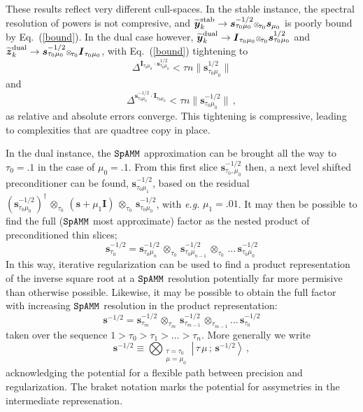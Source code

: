 \documentclass[letterpaper,twocolumn,amsmath,amsfont,amssymb,english,aps,jcp,preprintnumbers,groupaddress,nofootinbib,tightenlines,floatfix]{revtex4}
\newcommand{\mat}[1]{\boldsymbol{#1}}
\newcommand{\oto}{ {\scriptstyle \otimes}_{ \! \tau_0 } }
\newcommand{\otm}{ {\scriptstyle \otimes}_{ \! \tau_m } }
\newcommand{\otmm}{ {\scriptstyle \otimes}_{ \! \tau_{m-1}}}
\theoremstyle{plain}
\theoremstyle{remark}
\theoremstyle{plain}
\begin{document}
These results reflect very different cull-spaces.  In the stable instance, the spectral resolution of powers is not compresive, and  
$\widetilde{\mat{y}}^{\rm stab}_k \rightarrow  \mat{s}^{-1/2}_{\tau_0 \mu_0} \oto \mat{s}_{\mu_0}$ is  poorly bound by Eq.~(\ref{bound}).
In the dual case however, $\widetilde{\mat{y}}^{\rm dual}_k \rightarrow  \mat{I}_{\tau_0 \mu_0} \oto \mat{s}^{1/2}_{\tau_0 \mu_0}$
and $\widetilde{\mat{z}}^{\rm dual}_k \rightarrow  \mat{s}^{-1/2}_{\tau_0 \mu_0} \oto \mat{I}_{\tau_0 \mu_0}$, 
with Eq.~(\ref{bound}) tightening to
\begin{equation}\label{boundY}
\Delta^{\mat{I}_{\tau_0 \mu_0} \cdot \mat{s}^{1/2}_{\tau_0 \mu_0}} <  \tau n \lVert \mat{s}^{1/2}_{\tau_0 \mu_0} \rVert
\end{equation}
and 
\begin{equation}\label{boundZ}
\Delta^{ \mat{s}^{-1/2}_{\tau_0 \mu_0}\cdot \mat{I}_{\tau_0 \mu_0}}  <  \tau n \lVert \mat{s}^{-1/2}_{\tau_0 \mu_0} \rVert \, ,
\end{equation}
as relative and absolute errors converge.  This tightening is compressive, leading to complexities that are quadtree copy in place.   

In the dual instance, the $\tt SpAMM$ approximation can be brought all the way to  $\tau_0 = .1$ in the case of $\mu_0 = .1$.
From this first slice  $\mat{s}^{-1/2}_{\tau_0, \mu_0}$ then, a next level shifted preconditioner can be found, 
$\mat{s}^{-1/2}_{\tau_0 \mu_1}$, based on the residual 
$\left(\mat{s}^{-1/2}_{\tau_0\mu_0} \right)^\dagger \, \oto \, \left(\mat{s}+\mu_1 \mat{I} \right)  \, \oto \,\mat{s}^{-1/2}_{\tau_0 \mu_0} $, with {\em e.g.} 
$\mu_1= .01$. It may then be possible to find the full ($\tt SpAMM$ most approximate) 
factor as the nested product of preconditioned thin slices;
\begin{equation}
\mat{s}^{-1/2}_{\tau_0} = \mat{s}^{-1/2}_{\tau_0 \mu_n} \, \oto \, \mat{s}^{-1/2}_{\tau_0 \mu_{n-1}} \, \oto \, \dots  \,  \mat{s}^{-1/2}_{\tau_0 \mu_0}
\end{equation}
In this way, 
iterative regularization can be used to find a product representation of the inverse square root at a $\tt SpAMM$ resolution 
potentially far more permisive than otherwise possible. 
Likewise, it may be possible to obtain the full factor with increasing $\tt SpAMM$ resolution in the product representation:
\begin{equation}
\mat{s}^{-1/2} = \mat{s}^{-1/2}_{\tau_m} \, \otm \,  \mat{s}^{-1/2}_{\tau_{m-1}} \, \otmm \dots \, \mat{s}^{-1/2}_{\tau_0}
\end{equation}taken over the sequence $1 > \tau_0 > \tau_1 > \dots > \tau_n $.  More generally we write 
\begin{equation}
\mat{s}^{-1/2} \equiv \bigotimes_{\substack{\tau=\tau_0 \\ \mu=\mu_0   } } {\left|\, \tau\, \mu \, ; \, \scriptstyle{\mat{s}^{-1/2}}  \right>}  \, ,
\end{equation}
acknowledging the potential for a flexible path between precision and regularization. The braket notation marks 
the potential for assymetries in the intermediate represenation.  
\end{document}
